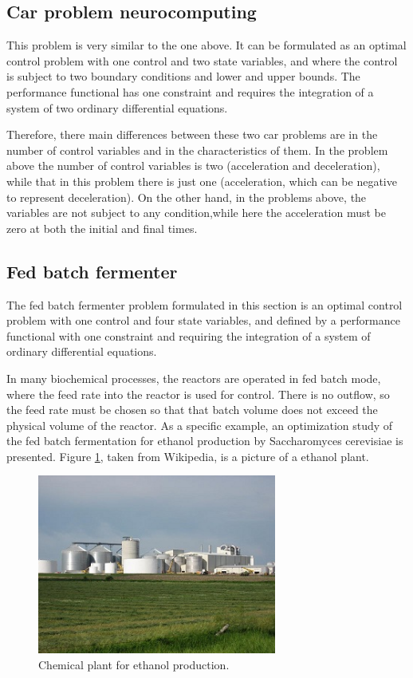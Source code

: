 \subsection*{Car problem neurocomputing}

This problem is very similar to the one above. 
It can be formulated as an optimal control problem with one control and two state variables, 
and where the control is subject to two boundary conditions and lower and upper bounds. 
The performance functional has one constraint and requires the integration of a system of two ordinary differential equations. 

Therefore, there main differences between these two car problems are in the number of control variables and in the characteristics of them.
In the problem above the number of control variables is two (acceleration and deceleration), while that in this problem there is just one (acceleration, which can be negative to represent deceleration).
On the other hand, in the problems above, the variables are not subject to any condition,while here the acceleration must be zero at both the initial and final times.

\subsection*{Fed batch fermenter}

The fed batch fermenter problem formulated in this section is an optimal
control problem with one control and four state variables, and defined by
a performance functional with one constraint and requiring the integration
of a system of ordinary differential equations. 

In many biochemical processes, the reactors are operated in fed batch mode,
where the feed rate into the reactor is used for control. 
There is no outflow, so the feed rate must be chosen so that that batch volume does not exceed
the physical volume of the reactor.
As a specific example, an optimization study of the fed batch fermentation
for ethanol production by Saccharomyces cerevisiae is presented.
Figure \ref{EthanolPlantFigure}, taken from Wikipedia, is a picture of a ethanol plant. 

\begin{figure}[!hbp]
\begin{center}
\includegraphics[width=0.7\textwidth]{optimal_control/ethanol_plant}
\caption{Chemical plant for ethanol production.}\label{EthanolPlantFigure}
\end{center}
\end{figure}


